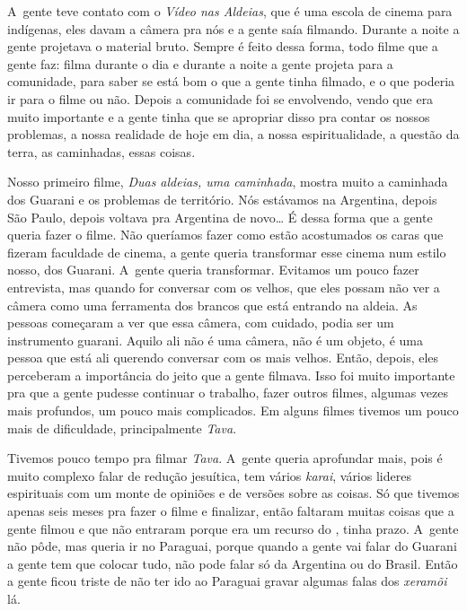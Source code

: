 A~gente teve contato com o \emph{Vídeo nas Aldeias}, que é uma escola de
cinema para indígenas, eles davam a câmera pra nós e a gente saía
filmando. Durante a noite a gente projetava o material bruto. Sempre é
feito dessa forma, todo filme que a gente faz: filma durante o dia e
durante a noite a gente projeta para a comunidade, para saber se está
bom o que a gente tinha filmado, e o que poderia ir para o filme ou não.
Depois a comunidade foi se envolvendo, vendo que era muito importante e
a gente tinha que se apropriar disso pra contar os nossos problemas, a
nossa realidade de hoje em dia, a nossa espiritualidade, a questão da
terra, as caminhadas, essas coisas.

Nosso primeiro filme, \emph{Duas aldeias, uma caminhada}, mostra muito a
caminhada dos Guarani e os problemas de território. Nós estávamos na
Argentina, depois São Paulo, depois voltava pra Argentina de novo\ldots{} É
dessa forma que a gente queria fazer o filme. Não queríamos fazer como
estão acostumados os caras que fizeram faculdade de cinema, a gente
queria transformar esse cinema num estilo nosso, dos Guarani. A~gente
queria transformar. Evitamos um pouco fazer entrevista, mas quando for
conversar com os velhos, que eles possam não ver a câmera como uma
ferramenta dos brancos que está entrando na aldeia. As pessoas começaram
a ver que essa câmera, com cuidado, podia ser um instrumento guarani.
Aquilo ali não é uma câmera, não é um objeto, é uma pessoa que está ali
querendo conversar com os mais velhos. Então, depois, eles perceberam a
importância do jeito que a gente filmava. Isso foi muito importante pra
que a gente pudesse continuar o trabalho, fazer outros filmes, algumas
vezes mais profundos, um pouco mais complicados. Em alguns filmes
tivemos um pouco mais de dificuldade, principalmente \emph{Tava}.

Tivemos pouco tempo pra filmar \emph{Tava}. A~gente queria aprofundar mais,
pois é muito complexo falar de redução jesuítica, tem vários \emph{karai},
vários lideres espirituais com um monte de opiniões e de versões sobre
as coisas. Só que tivemos apenas seis meses pra fazer o filme e
finalizar, então faltaram muitas coisas que a gente filmou e que não
entraram porque era um recurso do , tinha prazo. A~gente não pôde,
mas queria ir no Paraguai, porque quando a gente vai falar do Guarani a
gente tem que colocar tudo, não pode falar só da Argentina ou do
Brasil. Então a gente ficou triste de não ter ido ao Paraguai gravar
algumas falas dos \emph{xeramõi} lá. 

